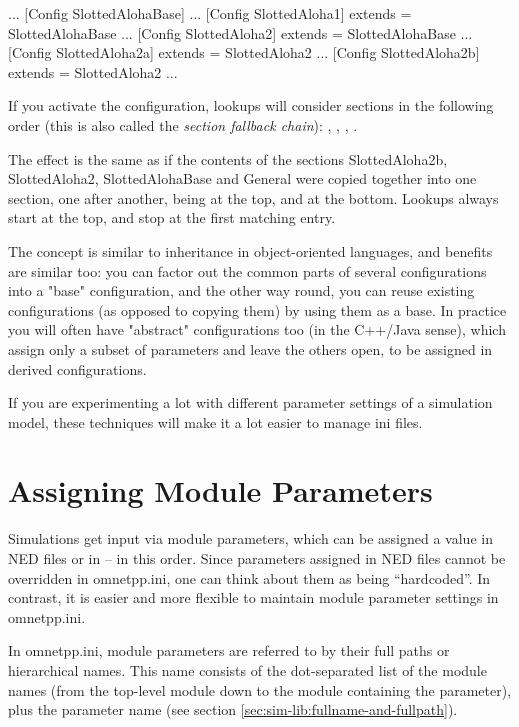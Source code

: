 \begin{inifile}
[General]
...
[Config SlottedAlohaBase]
...
[Config SlottedAloha1]
extends = SlottedAlohaBase
...
[Config SlottedAloha2]
extends = SlottedAlohaBase
...
[Config SlottedAloha2a]
extends = SlottedAloha2
...
[Config SlottedAloha2b]
extends = SlottedAloha2
...
\end{inifile}


If you activate the  configuration, lookups will consider
sections in the following order (this is also called the
\textit{section fallback chain}): ,
, , .

The effect is the same as if the contents of the sections
SlottedAloha2b, SlottedAloha2, SlottedAlohaBase and General were copied
together into one section, one after another, 
being at the top, and \ttt{[General]} at the bottom. Lookups always start at
the top, and stop at the first matching entry.

The concept is similar to inheritance in object-oriented languages,
and benefits are similar too: you can factor out the common parts of
several configurations into a "base"
configuration, and the other way round, you can reuse existing
configurations (as opposed to copying them) by using them as a base. In
practice you will often have "abstract"
configurations too (in the C++/Java sense), which assign only a subset
of parameters and leave the others open, to be assigned in derived
configurations.

If you are experimenting a lot with different parameter settings of a
simulation model, these techniques will make it a lot easier to manage
ini files.

\section{Assigning Module Parameters}
\label{sec:ch-config-sim:parameter-settings}

Simulations get input via module parameters, which can be assigned a
value in NED files or in  -- in this order. Since parameters
assigned in NED files cannot be overridden in omnetpp.ini, one can
think about them as being ``hardcoded''. In contrast, it is easier
and more flexible to maintain module parameter settings in omnetpp.ini.

In omnetpp.ini, module parameters are referred to by their full paths
or hierarchical names. This name consists of the dot-separated list of
the module names (from the top-level module down to the module containing
the parameter), plus the parameter name
(see section \ref{sec:sim-lib:fullname-and-fullpath}).

